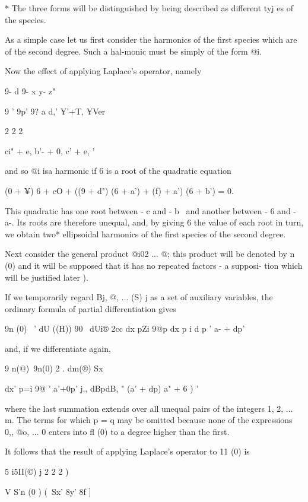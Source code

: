 * The three forms will be distinguished by being described as
different tyj es of the species.

%
%


As a simple case let us first consider the harmonics of the first
species which are of the second degree. Such a hal-monic must be
simply of the form @i.

Now the effect of applying Laplace's operator, namely

9- d 9- x y- z"

9 ' 9p' 9? a d,' ¥'+T, ¥Ver

2 2 2

ci" + e, b'- + 0, c' + e, '

and so @i isa harmonic if 6 is a root of the quadratic equation

(0 + ¥) 6 + cO + ((9 + d") (6 + a') + (f) + a') (6 + b') = 0.

This quadratic has one root between - c and - b~ and another between -
6 and - a-. Its roots are therefore unequal, and, by giving 6 the
value of each root in turn, we obtain two* ellipsoidal harmonics of
the first species of the second degree.

Next consider the general product @i02 ... @; this product will be
denoted by n (0) and it will be supposed that it has no repeated
factors - a supposi- tion which will be justified later ).

If we temporarily regard Bj, @, ... (S) j as a set of auxiliary
variables, the ordinary formula of partial differentiation gives

9n (0) \ ' dU ((H)) 90 \ dUi® 2cc dx pZi 9@p dx p i d p ' a- + dp'

and, if we differentiate again,

9 n(@)\ 9n(0) 2 . dm(®) Sx

dx' p=i 9@ ' a'+0p' j,, dBpdB, " (a' + dp) a" + 6 ) '

where the last summation extends over all unequal pairs of the
integers 1, 2, ... m. The terms for which p = q may be omitted because
none of the expressions 0,, @o, ... 0 enters into fl (0) to a degree
higher than the first.

It follows that the result of applying Laplace's operator to 11 (0) is

5 i5II(©) j 2 2 2 )

V S'n (0 ) (\ Sx' 8y' 8f ]

